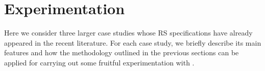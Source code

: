 
\section{Experimentation}\label{sec:experiments}

Here we consider 
three larger case studies whose RS specifications have already appeared in the recent literature. For each case study, we briefly describe its main features and how the methodology outlined in the previous sections can be applied for carrying out some fruitful experimentation with \GROOVE.
